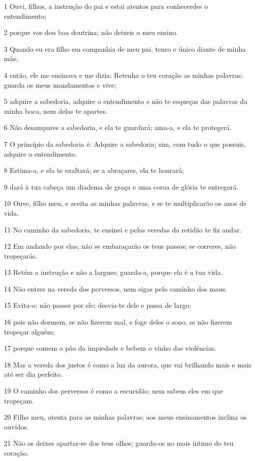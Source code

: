 \par 1 Ouvi, filhos, a instrução do pai e estai atentos para conhecerdes o entendimento;
\par 2 porque vos dou boa doutrina; não deixeis o meu ensino.
\par 3 Quando eu era filho em companhia de meu pai, tenro e único diante de minha mãe,
\par 4 então, ele me ensinava e me dizia: Retenha o teu coração as minhas palavras; guarda os meus mandamentos e vive;
\par 5 adquire a sabedoria, adquire o entendimento e não te esqueças das palavras da minha boca, nem delas te apartes.
\par 6 Não desampares a sabedoria, e ela te guardará; ama-a, e ela te protegerá.
\par 7 O princípio da sabedoria é: Adquire a sabedoria; sim, com tudo o que possuis, adquire o entendimento.
\par 8 Estima-a, e ela te exaltará; se a abraçares, ela te honrará;
\par 9 dará à tua cabeça um diadema de graça e uma coroa de glória te entregará.
\par 10 Ouve, filho meu, e aceita as minhas palavras, e se te multiplicarão os anos de vida.
\par 11 No caminho da sabedoria, te ensinei e pelas veredas da retidão te fiz andar.
\par 12 Em andando por elas, não se embaraçarão os teus passos; se correres, não tropeçarás.
\par 13 Retém a instrução e não a largues; guarda-a, porque ela é a tua vida.
\par 14 Não entres na vereda dos perversos, nem sigas pelo caminho dos maus.
\par 15 Evita-o; não passes por ele; desvia-te dele e passa de largo;
\par 16 pois não dormem, se não fizerem mal, e foge deles o sono, se não fizerem tropeçar alguém;
\par 17 porque comem o pão da impiedade e bebem o vinho das violências.
\par 18 Mas a vereda dos justos é como a luz da aurora, que vai brilhando mais e mais até ser dia perfeito.
\par 19 O caminho dos perversos é como a escuridão; nem sabem eles em que tropeçam.
\par 20 Filho meu, atenta para as minhas palavras; aos meus ensinamentos inclina os ouvidos.
\par 21 Não os deixes apartar-se dos teus olhos; guarda-os no mais íntimo do teu coração.
